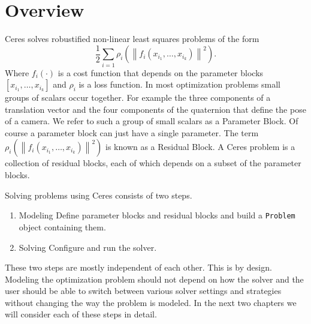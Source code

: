 \chapter{Overview}
\label{chapter:overview}
Ceres solves robustified non-linear least squares problems of the form 
\begin{equation}
\frac{1}{2}\sum_{i=1} \rho_i\left(\left\|f_i\left(x_{i_1},\hdots,x_{i_k}\right)\right\|^2\right).
\label{eq:ceresproblem}
\end{equation}
Where $f_i(\cdot)$ is a  cost function that depends on the parameter blocks $\left[x_{i_1}, \hdots , x_{i_k}\right]$ and  $\rho_i$ is a loss function. In most optimization problems small groups of scalars occur together. For example the three components of a translation vector and the four components of the quaternion that define the pose of a camera. We refer to such a group of small scalars as a Parameter Block. Of course a parameter block can just have a single parameter. 
The term $ \rho_i\left(\left\|f_i\left(x_{i_1},\hdots,x_{i_k}\right)\right\|^2\right)$ is known as a Residual Block. A Ceres problem is a collection of residual blocks, each of which depends on a subset of the parameter blocks.

Solving problems using Ceres consists of two steps.
\begin{enumerate}
\item{Modeling} Define parameter blocks and  residual blocks and build a \texttt{Problem} object containing them.
\item{Solving} Configure and run the solver.
\end{enumerate}

These two steps are mostly independent of each other. This is by design. Modeling the optimization problem should not depend on how the solver and the user should be able to switch between various solver settings and strategies without changing the way the problem is modeled. In the next two chapters we will consider each of these steps in detail.